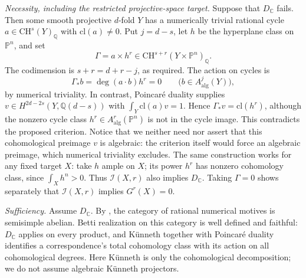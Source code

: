 \emph{Necessity, including the restricted projective-space target.}
Suppose that $D_{\mathbb C}$ fails. Then some smooth projective
$d$-fold $Y$ has a numerically trivial rational cycle
$a\in\mathrm{CH}^s(Y)_{\mathbb Q}$ with
$\mathrm{cl}(a)\ne0$. Put $j=d-s$, let $h$ be the hyperplane
class on $\mathbb P^n$, and set
\[
 \Gamma=a\times h^r\in
       \mathrm{CH}^{s+r}(Y\times\mathbb P^n)_{\mathbb Q}.
\]
The codimension is $s+r=d+r-j$, as required. The action on
cycles is
\[
 \Gamma_*b=\deg(a\cdot b)h^r=0
       \qquad\bigl(b\in A^j_{\mathrm{alg}}(Y)\bigr),
\]
by numerical triviality. In contrast, Poincar\'e duality supplies
$v\in H^{2d-2s}(Y,\mathbb Q(d-s))$ with
$\int_Y\mathrm{cl}(a)v=1$. Hence
$\Gamma_*v=\mathrm{cl}(h^r)$, although the nonzero cycle class
$h^r\in A^r_{\mathrm{alg}}(\mathbb P^n)$ is not in the cycle
image. This contradicts the proposed criterion. Notice that
we neither need nor assert that this cohomological preimage
$v$ is algebraic: the criterion itself would force an
algebraic preimage, which numerical triviality excludes.
The same construction works for any fixed target $X$: take
$h$ ample on $X$; its power $h^r$ has nonzero cohomology
class, since $\int_Xh^n>0$. Thus $\mathcal I(X,r)$ also
implies $D_{\mathbb C}$. Taking $\Gamma=0$ shows separately
that $\mathcal I(X,r)$ implies $G^r(X)=0$.

\emph{Sufficiency.}
Assume $D_{\mathbb C}$. By \citet[Theorem~1, pp.~448--449]
{Jannsen1992}, the category of rational numerical motives
is semisimple abelian. Betti realization on this category is
well defined and faithful: $D_{\mathbb C}$ applies on every
product, and K\"unneth together with Poincar\'e duality
identifies a correspondence's total cohomology class with
its action on all cohomological degrees. Here K\"unneth is
only the cohomological decomposition; we do not assume
algebraic K\"unneth projectors.

